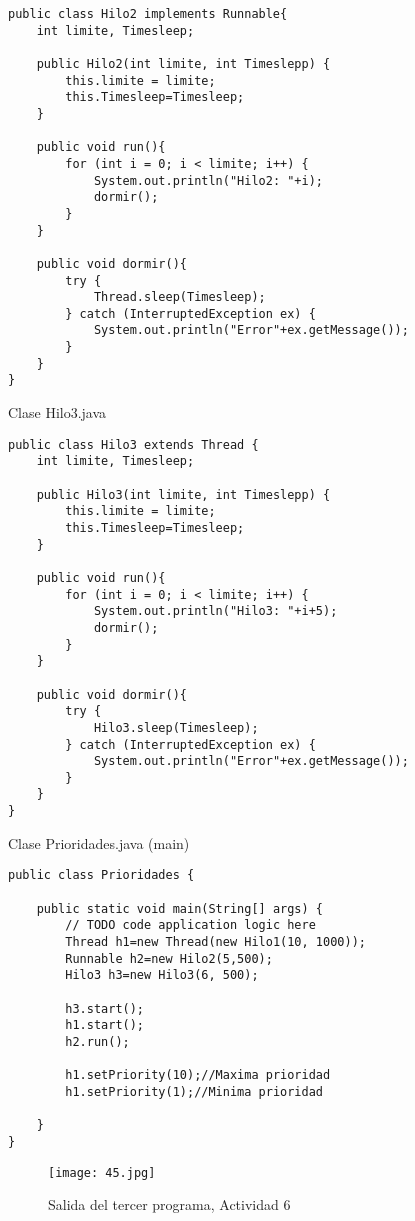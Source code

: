 \begin{verbatim}
public class Hilo2 implements Runnable{
    int limite, Timesleep;

    public Hilo2(int limite, int Timeslepp) {
        this.limite = limite;
        this.Timesleep=Timesleep;
    }
    
    public void run(){
        for (int i = 0; i < limite; i++) {
            System.out.println("Hilo2: "+i);
            dormir();
        }
    }
    
    public void dormir(){
        try {
            Thread.sleep(Timesleep);
        } catch (InterruptedException ex) {
            System.out.println("Error"+ex.getMessage());
        }
    }
}
\end{verbatim} \vspace{1cm}

\begin{center}
Clase Hilo3.java
\end{center}

\begin{verbatim}
public class Hilo3 extends Thread {
    int limite, Timesleep;

    public Hilo3(int limite, int Timeslepp) {
        this.limite = limite;
        this.Timesleep=Timesleep;
    }
    
    public void run(){
        for (int i = 0; i < limite; i++) {
            System.out.println("Hilo3: "+i+5);
            dormir();
        }
    }
    
    public void dormir(){
        try {
            Hilo3.sleep(Timesleep);
        } catch (InterruptedException ex) {
            System.out.println("Error"+ex.getMessage());
        }
    }
}
\end{verbatim} \vspace{1cm}

\begin{center}
Clase Prioridades.java (main)
\end{center}

\begin{verbatim}
public class Prioridades {

    public static void main(String[] args) {
        // TODO code application logic here
        Thread h1=new Thread(new Hilo1(10, 1000));
        Runnable h2=new Hilo2(5,500);
        Hilo3 h3=new Hilo3(6, 500);
        
        h3.start();
        h1.start();
        h2.run();
        
        h1.setPriority(10);//Maxima prioridad
        h1.setPriority(1);//Minima prioridad
        
    }
}
\end{verbatim} \vspace{1cm}
\begin{figure}[h!]
		\centering
		{\texttt{[image: 45.jpg]}\par} 
		\caption{Salida del tercer programa, Actividad 6}\vspace{1cm}
\end{figure}\newpage

